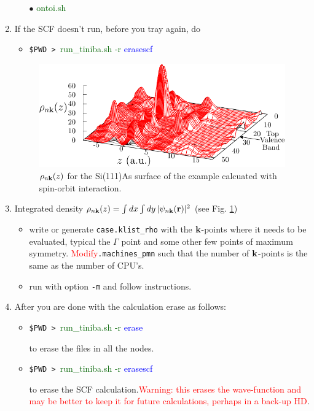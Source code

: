 \documentclass[openany,oneside]{book}
\numberwithin{equation}{section}
\begin{document}
\begin{enumerate}
\begin{itemize}
$\bullet$ \textcolor{darkgreen}{ontoi.sh}

\end{itemize}

\item If the SCF doesn't run, before you tray again, do
\begin{itemize}
\item\verb=$PWD > =\textcolor{darkgreen}{run\_tiniba.sh -r} \textcolor{blue}{erasescf}
\end{itemize}

\begin{figure}[t]
\begin{center}
\includegraphics[scale=1.0]{plots/3drho}
\end{center}
\caption{$\rho_{n\mathbf{k}}(z)$ for the Si(111)As surface of the example
  calcuated with spin-orbit interaction.
}
\label{figrho}
\end{figure}

\item Integrated density  $\rho_{n\mathbf{k}}(z)=\int dx\int  dy\,|\psi_{n\mathbf{k}}(\mathbf{r})|^2$ (see Fig. \ref{figrho})

\begin{itemize}
\item
 write or generate \verb=case.klist_rho= with the
 $\mathbf{k}$-points where it
needs to be evaluated, typical the $\Gamma$ point and some other few
points of maximum
symmetry. \textcolor{red}{Modify}\verb=.machines_pmn= such that the
number of $\mathbf{k}$-points is the same as the number of CPU's.
\item run with option \verb=-m= and follow instructions.
\end{itemize}
\item After you are done with the calculation erase as follows:
\begin{itemize}
\item\verb=$PWD > =\textcolor{darkgreen}{run\_tiniba.sh -r} \textcolor{blue}{erase}

to erase the files in all the nodes.

\item\verb=$PWD > =\textcolor{darkgreen}{run\_tiniba.sh -r} \textcolor{blue}{erasescf}

to erase the SCF calculation.\textcolor{red}{Warning: this erases the wave-function and may
 be better to keep it for future calculations, perhaps in a back-up HD}.

\end{itemize}

\end{enumerate}
\end{document}
